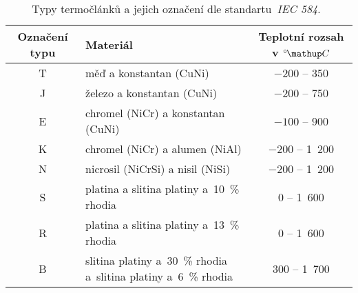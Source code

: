 \begin{table}[htbp]
    \centering
    \begin{tabular}{cm{7cm}c}
        \toprule
        Označení typu & Materiál & Teplotní rozsah v $\C$\\
        \midrule
        T & měď a konstantan (CuNi) & $-200$ -- 350\phantom{1 }\\
        J & železo a konstantan (CuNi)& $-200$ -- 750\phantom{1 }\\
        E & chromel (NiCr) a konstantan (CuNi) & $-100$ -- 900\phantom{1 }\\
        K & chromel (NiCr) a alumen (NiAl) & $-200$ -- 1~200\\
        N & nicrosil (NiCrSi) a nisil (NiSi) & $-200$ -- 1~200\\
        S & platina a slitina platiny a~10~\% rhodia & \phantom{$-00$}0 -- 1~600\\
        R & platina a slitina platiny a~13~\% rhodia & \phantom{$-00$}0 -- 1~600\\
        B & slitina platiny a~30~\% rhodia a~slitina platiny 
        a~6~\% rhodia & \phantom{$-$}300 -- 1~700\\
        \bottomrule
    \end{tabular}
    \caption{Typy termočlánků a jejich označení dle 
    standartu~\emph{IEC 584}.~\cite{diplomka,iec584}}
    \label{tab:iec584}
\end{table}
